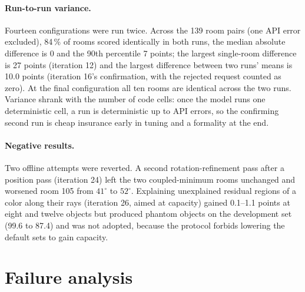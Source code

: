 \documentclass[10pt,a4paper]{article}
\begin{document}
\paragraph{Run-to-run variance.}
Fourteen configurations were run twice. Across the 139 room pairs (one API error excluded), 84\,\% of rooms scored identically in both runs, the median absolute difference is 0 and the 90th percentile 7 points; the largest single-room difference is 27 points (iteration 12) and the largest difference between two runs' means is 10.0 points (iteration 16's confirmation, with the rejected request counted as zero). At the final configuration all ten rooms are identical across the two runs. Variance shrank with the number of code cells: once the model runs one deterministic cell, a run is deterministic up to API errors, so the confirming second run is cheap insurance early in tuning and a formality at the end.

\paragraph{Negative results.}
Two offline attempts were reverted. A second rotation-refinement pass after a position pass (iteration 24) left the two coupled-minimum rooms unchanged and worsened room 105 from $41^\circ$ to $52^\circ$. Explaining unexplained residual regions of a color along their rays (iteration 26, aimed at capacity) gained 0.1--1.1 points at eight and twelve objects but produced phantom objects on the development set (99.6 to 87.4) and was not adopted, because the protocol forbids lowering the default sets to gain capacity.

\section{Failure analysis}
\label{sec:failures}
\end{document}
